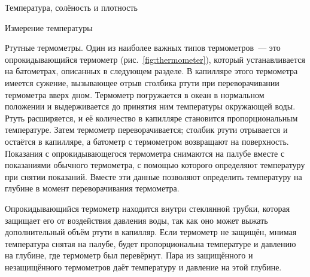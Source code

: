 \begin{chapter}{Температура, солёность и плотность}
\begin{section}{Измерение температуры}
\begin{paragraph}{Ртутные термометры.}
Один из наиболее важных типов термометров~--- это опрокидывающийся
термометр (рис.~\ref{fig:thermometer}), который устанавливается 
на батометрах, описанных в следующем
разделе. В капилляре этого термометра имеется сужение, вызывающее отрыв
столбика ртути при переворачивании термометра вверх дном. Термометр
погружается в океан в нормальном положении и выдерживается до принятия
ним температуры окружающей воды. Ртуть расширяется, и её количество в
капилляре становится пропорциональным температуре. Затем термометр
переворачивается; столбик ртути отрывается и остаётся в капилляре, а
батометр с термометром возвращают на поверхность. Показания с
опрокидывающегося термометра снимаются на палубе вместе с показаниями
обычного термометра, с помощью которого определяют температуру при
снятии показаний. Вместе эти данные позволяют определить температуру 
на глубине в момент переворачивания термометра.
%


Опрокидывающийся термометр находится внутри стеклянной трубки, которая
защищает его от воздействия давления воды, так как оно может
выжать дополнительный объём ртути в капилляр. Если термометр не защищён,
мнимая температура снятая на палубе, будет пропорциональна температуре
и давлению на глубине, где термометр был перевёрнут. Пара из
защищённого и незащищённого термометров даёт температуру и давление на
этой глубине.
%


\end{paragraph}
\end{section}
\end{chapter}
